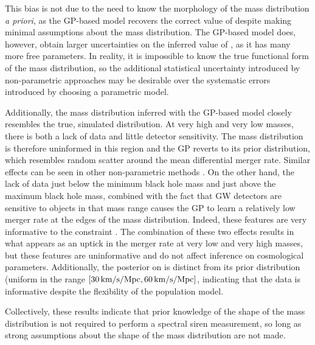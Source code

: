 \documentclass[]{aastex631}
\begin{document}
This bias is not due to the need to know the morphology of the mass distribution \emph{a priori}, as the \ac{GP}-based model recovers the correct value of \Ho{} despite making minimal assumptions about the mass distribution.
The \ac{GP}-based model does, however, obtain larger uncertainties on the inferred value of \Ho, as it has many more free parameters. 
In reality, it is impossible to know the true functional form of the mass distribution, so the additional statistical uncertainty introduced by non-parametric approaches may be desirable over the systematic errors introduced by choosing a parametric model.

Additionally, the mass distribution inferred with the \ac{GP}-based model closely resembles the true, simulated distribution.
At very high and very low masses, there is both a lack of data and little detector sensitivity.
The mass distribution is therefore uninformed in this region and the \ac{GP} reverts to its prior distribution, which resembles random scatter around the mean differential merger rate.
Similar effects can be seen in other non-parametric methods \citep{edelman_cover_2023, callister_parameter-free_2023}.
On the other hand, the lack of data just below the minimum black hole mass and just above the maximum black hole mass, combined with the fact that \ac{GW} detectors are sensitive to objects in that mass range causes the \ac{GP} to learn a relatively low merger rate at the edges of the mass distribution.
Indeed, these features are very informative to the \Ho{} constraint \citep{the_ligo_scientific_collaboration_constraints_2021}.
The combination of these two effects results in what appears as an uptick in the merger rate at very low and very high masses, but these features are uninformative and do not affect inference on cosmological parameters.
Additionally, the posterior on \Ho{} is distinct from its prior distribution (uniform in the range $[30\,\text{km/s/Mpc},60\,\text{km/s/Mpc}]$, indicating that the data is informative despite the flexibility of the population model.

Collectively, these results indicate that prior knowledge of the shape of the mass distribution is not required to perform a spectral siren measurement, so long as strong assumptions about the shape of the mass distribution are not made.
\end{document}
